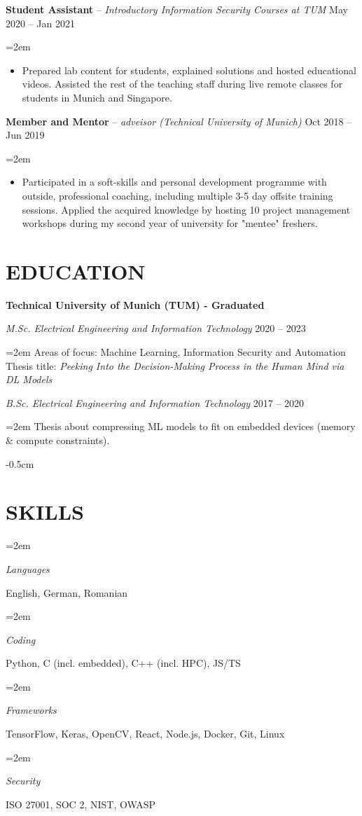 \documentclass[paper=a4,fontsize=11pt]{scrartcl}
\newlength{\spacebox}
\newcommand{\sepspace}{\vspace*{0.35em}}		%
\newcommand{\NewPart}[1]{\section*{\uppercase{#1}}}
\newcommand{\PersonalEntry}[2]{
		\noindent\hangindent=2em\hangafter=0 %
		\parbox{\spacebox}{        %
		\textit{#1}}		       %
		\hspace{1.5em} #2 \par}    %
\newcommand{\SkillsEntry}[2]{      %
		\noindent\hangindent=2em\hangafter=0 %
		\parbox{\spacebox}{        %
		\textit{#1}}			   %
		\hspace{2.5em} #2 \par}    %
\newcommand{\EducationEntry}[4]{
		\noindent \textit{#1} \hfill      %
		\colorbox{custom_gray}{\color{white}#2} \par  %
		\noindent\hangindent=2em\hangafter=0 \small #3 %
		\normalsize \par}
\newcommand{\WorkEntry}[4]{				  %
		\noindent \textbf{#1} – \textit{#3} \hfill      %
		\colorbox{custom_gray}{\color{white}#2} \par  %
		\noindent\hangindent=2em\hangafter=0 \small #4 %
		\normalsize \par}
\begin{document}
\WorkEntry{Student Assistant}{May 2020 – Jan 2021}{Introductory Information Security Courses at TUM}
{
\begin{itemize}
  \item Prepared lab content for students, explained solutions and hosted educational videos. Assisted the rest of the teaching staff during live remote classes for students in Munich and Singapore.
\end{itemize}
}

\WorkEntry{Member and Mentor}{Oct 2018 – Jun 2019}{adveisor (Technical University of Munich)}
{
\begin{itemize}
	\item Participated in a soft-skills and personal development programme with outside, professional coaching, including multiple 3-5 day offsite training sessions. Applied the acquired knowledge by hosting 10 project management workshops during my second year of university for "mentee" freshers.
\end{itemize}
}


\vspace{-0.5cm}
\NewPart{Education}{}
\vspace{-0.3cm}
\textbf{Technical University of Munich (TUM) - Graduated}

\EducationEntry{M.Sc. Electrical Engineering and Information Technology}{2020 – 2023}{Areas of focus: Machine Learning, Information Security and Automation \\
Thesis title: \textsl{Peeking Into the Decision-Making Process in the Human Mind via DL Models}}
\sepspace

\EducationEntry{B.Sc. Electrical Engineering and Information Technology}{2017 – 2020} {Thesis about compressing ML models to fit on embedded devices (memory \& compute constraints).}


\vspace{-0.5cm}
\NewPart{Skills}{}

\SkillsEntry{Languages}{English, German, Romanian}
\SkillsEntry{Coding}{Python, \textsc{C} (incl. embedded), \textsc{C++} (incl. HPC), JS/TS}
\SkillsEntry{Frameworks}{TensorFlow, Keras, OpenCV, React, Node.js, Docker, Git, Linux}
\SkillsEntry{Security}{ISO 27001, SOC 2, NIST, OWASP}


\end{document}
